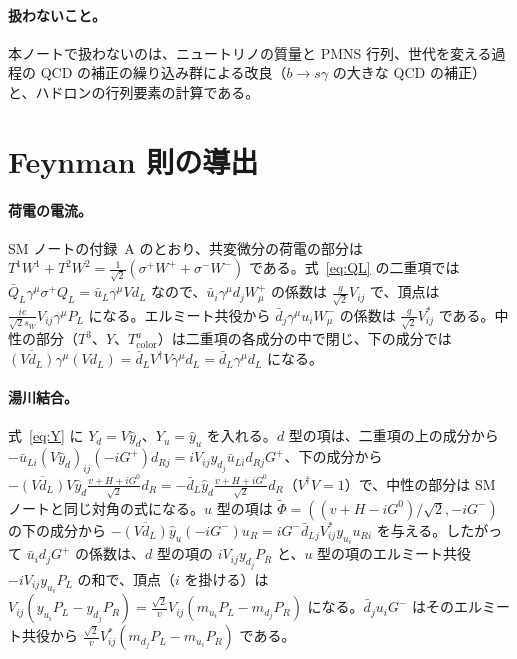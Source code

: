 \documentclass[a4paper,10pt]{ltjsarticle}
\newcommand{\sw}{s_W}
\begin{document}
\paragraph{扱わないこと。}本ノートで扱わないのは、ニュートリノの質量と PMNS 行列、世代を変える過程の QCD の補正の繰り込み群による改良（$b\to s\gamma$ の大きな QCD の補正）と、ハドロンの行列要素の計算である。

\appendix

\section{Feynman 則の導出}\label{app:rules}

\paragraph{荷電の電流。}SM ノートの付録~A のとおり、共変微分の荷電の部分は $T^1W^1+T^2W^2=\frac1{\sqrt2}(\sigma^+W^++\sigma^-W^-)$ である。式~\eqref{eq:QL} の二重項では $\bar Q_L\gamma^\mu\sigma^+Q_L=\bar u_L\gamma^\mu Vd_L$ なので、$\bar u_i\gamma^\mu d_jW^+_\mu$ の係数は $\frac g{\sqrt2}V_{ij}$ で、頂点は $\frac{ie}{\sqrt2\sw}V_{ij}\gamma^\mu P_L$ になる。エルミート共役から $\bar d_j\gamma^\mu u_iW^-_\mu$ の係数は $\frac g{\sqrt2}V_{ij}^*$ である。中性の部分（$T^3$、$Y$、$T^a_{\mathrm{color}}$）は二重項の各成分の中で閉じ、下の成分では $\overline{(Vd_L)}\gamma^\mu(Vd_L)=\bar d_LV^\dagger V\gamma^\mu d_L=\bar d_L\gamma^\mu d_L$ になる。

\paragraph{湯川結合。}式~\eqref{eq:Y} に $Y_d=V\hat y_d$、$Y_u=\hat y_u$ を入れる。$d$ 型の項は、二重項の上の成分から $-\bar u_{Li}(V\hat y_d)_{ij}(-iG^+)d_{Rj}=iV_{ij}y_{d_j}\bar u_{Li}d_{Rj}G^+$、下の成分から $-\overline{(Vd_L)}V\hat y_d\frac{v+H+iG^0}{\sqrt2}d_R=-\bar d_L\hat y_d\frac{v+H+iG^0}{\sqrt2}d_R$（$V^\dagger V=1$）で、中性の部分は SM ノートと同じ対角の式になる。$u$ 型の項は $\tilde\Phi=((v+H-iG^0)/\sqrt2,-iG^-)$ の下の成分から $-\overline{(Vd_L)}\hat y_u(-iG^-)u_R=iG^-\bar d_{Lj}V_{ij}^*y_{u_i}u_{Ri}$ を与える。したがって $\bar u_id_jG^+$ の係数は、$d$ 型の項の $iV_{ij}y_{d_j}P_R$ と、$u$ 型の項のエルミート共役 $-iV_{ij}y_{u_i}P_L$ の和で、頂点（$i$ を掛ける）は $V_{ij}(y_{u_i}P_L-y_{d_j}P_R)=\frac{\sqrt2}vV_{ij}(m_{u_i}P_L-m_{d_j}P_R)$ になる。$\bar d_ju_iG^-$ はそのエルミート共役から $\frac{\sqrt2}vV_{ij}^*(m_{d_j}P_L-m_{u_i}P_R)$ である。
\end{document}
